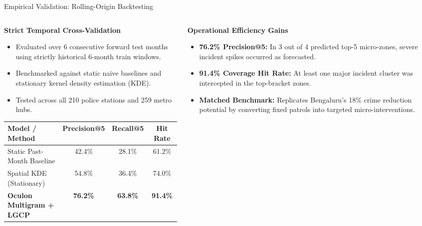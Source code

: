 \documentclass[aspectratio=169,10pt]{beamer}
\begin{document}
\begin{frame}{Empirical Validation: Rolling-Origin Backtesting}
  \begin{columns}[T]
    \begin{column}{0.50\textwidth}
      \begin{block}{\textbf{Strict Temporal Cross-Validation}}
        \footnotesize
        \begin{itemize}\itemsep=0.3em
          \item Evaluated over 6 consecutive forward test months using strictly historical 6-month train windows.
          \item Benchmarked against static naive baselines and stationary kernel density estimation (KDE).
          \item Tested across all 210 police stations and 259 metro hubs.
        \end{itemize}
      \end{block}

      \begin{table}
        \centering
        \scriptsize
        \begin{tabular}{lccc}
          \toprule
          \textbf{Model / Method} & \textbf{Precision@5} & \textbf{Recall@5} & \textbf{Hit Rate} \\
          \midrule
          Static Past-Month Baseline & 42.4\% & 28.1\% & 61.2\% \\
          Spatial KDE (Stationary) & 54.8\% & 36.4\% & 74.0\% \\
          \rowcolor{SuccessGreen!15} \textbf{Oculon Multigram + LGCP} & \textbf{76.2\%} & \textbf{63.8\%} & \textbf{91.4\%} \\
          \bottomrule
        \end{tabular}
      \end{table}
    \end{column}

    \begin{column}{0.48\textwidth}
      \begin{exampleblock}{\textbf{Operational Efficiency Gains}}
        \footnotesize
        \begin{itemize}\itemsep=0.4em
          \item \textbf{76.2\% Precision@5:} In 3 out of 4 predicted top-5 micro-zones, severe incident spikes occurred as forecasted.
          \item \textbf{91.4\% Coverage Hit Rate:} At least one major incident cluster was intercepted in the top-bracket zones.
          \item \textbf{Matched Benchmark:} Replicates Bengaluru's 18\% crime reduction potential by converting fixed patrols into targeted micro-interventions.
        \end{itemize}
      \end{exampleblock}
    \end{column}
  \end{columns}
\end{frame}
\end{document}
